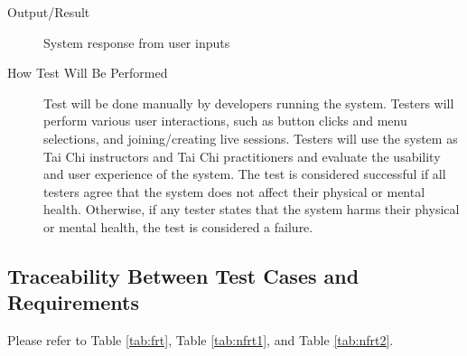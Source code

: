 \documentclass[12pt, titlepage]{article}
\begin{document}
\begin{enumerate}[NFR-T1]
\begin{description}
  \item[Output/Result] System response from user inputs
  \item[How Test Will Be Performed] Test will be done manually by developers
    running the system. Testers will perform various user interactions, such as
    button clicks and menu selections, and joining/creating live sessions.
    Testers will use the system as Tai Chi instructors and Tai Chi practitioners
    and evaluate the usability and user experience of the system. The test is
    considered successful if all testers agree that the system does not affect
    their physical or mental health. Otherwise, if any tester states that the
    system harms their physical or mental health, the test is considered a
    failure.
  \end{description}
\end{enumerate}

\subsection{Traceability Between Test Cases and Requirements}

Please refer to Table \ref{tab:frt}, Table \ref{tab:nfrt1}, and Table \ref{tab:nfrt2}.
\end{document}
